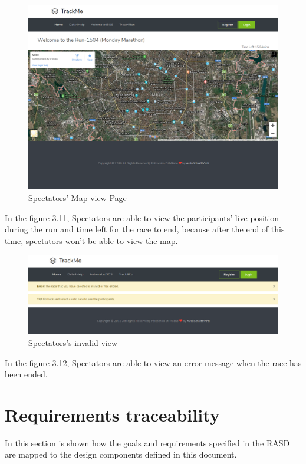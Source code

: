 \documentclass[a4paper, hidelinks, 12pt]{report}
\begin{document}
	
	\begin{figure}[H]
		\centering
		\includegraphics[scale=0.35]{UI/Spectators_map.png}
		\caption[UI: Spectators' Map-view Page]{Spectators' Map-view Page}
		\label{fig:Spectators' Map-view Page}
	\end{figure}
	
	In the figure 3.11, Spectators are able to view  the participants' live position during the run and time left for the race to end, because after the end of this time, spectators won't be able to view the map.
	
	
	
	
	\begin{figure}[H]
		\centering
		\includegraphics[scale=0.35]{UI/spectator_invalid.png}
		\caption[UI: Spectators's invalid view]{Spectators's invalid view}
		\label{fig:Spectators's invalid view}
	\end{figure}
	
	In the figure 3.12, Spectators are able to view an error message when the race has been ended. 
	
	\chapter{Requirements traceability}
	In this section is shown how the goals and requirements specified in the RASD are mapped to the design components defined in this document.
	
\end{document}
